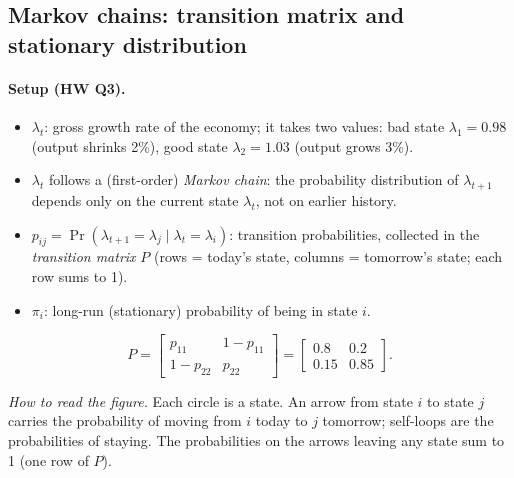 \subsection{Markov chains: transition matrix and stationary distribution }

\paragraph{Setup (HW Q3).}
\begin{itemize}
\item $\lambda_t$: gross growth rate of the economy; it takes two values: bad state $\lambda_1=0.98$ (output shrinks 2\%), good state $\lambda_2=1.03$ (output grows 3\%).
\item $\lambda_t$ follows a (first-order) \emph{Markov chain}: the probability distribution of $\lambda_{t+1}$ depends only on the current state $\lambda_t$, not on earlier history.
\item $p_{ij}=\Pr(\lambda_{t+1}=\lambda_j\mid\lambda_t=\lambda_i)$: transition probabilities, collected in the \emph{transition matrix} $P$ (rows = today's state, columns = tomorrow's state; each row sums to 1).
\item $\pi_i$: long-run (stationary) probability of being in state $i$.
\end{itemize}
\[
P=\begin{bmatrix}p_{11}&1-p_{11}\\1-p_{22}&p_{22}\end{bmatrix}=\begin{bmatrix}0.8&0.2\\0.15&0.85\end{bmatrix}.
\]

\begin{center}
\end{center}
\textit{How to read the figure.} Each circle is a state. An arrow from state $i$ to state $j$ carries the probability of moving from $i$ today to $j$ tomorrow; self-loops are the probabilities of staying. The probabilities on the arrows leaving any state sum to 1 (one row of $P$).

